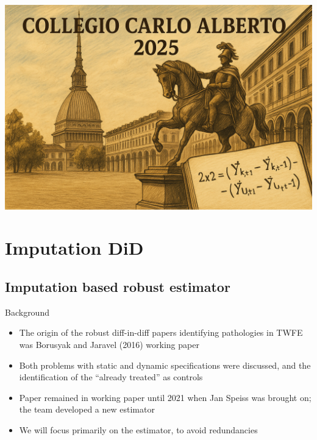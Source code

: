 \documentclass{beamer}
\begin{document}
\begin{frame}[plain]  %
\vfill
\begin{center}
  \includegraphics[width=0.85\linewidth]{./lecture_includes/banner_cropped}
\end{center}
\vfill
\end{frame}




\section{Imputation DiD}

\subsection{Imputation based robust estimator}



\begin{frame}{Background}

\begin{itemize}

\item The origin of the robust diff-in-diff papers identifying pathologies in TWFE was Borusyak and Jaravel (2016) working paper
\item Both problems with static and dynamic specifications were discussed, and the identification of the ``already treated'' as controls
\item Paper remained in working paper until 2021 when Jan Speiss was brought on; the team developed a new estimator
\item We will focus primarily on the estimator, to avoid redundancies

\end{itemize}

\end{frame}
\end{document}

